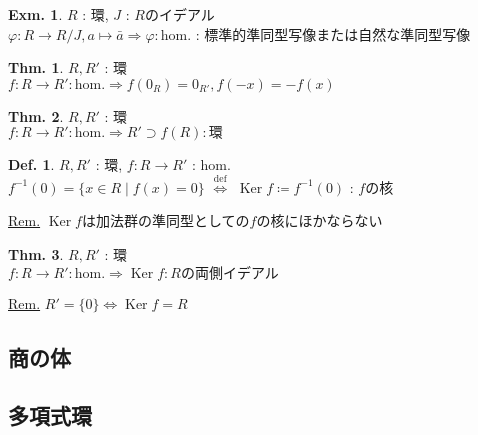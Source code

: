 \documentclass[uplatex,dvipdfmx,9pt]{beamer}
\newcommand{\defarrow}{\overset{\mathrm{def}}{\Leftrightarrow}}
\newcommand{\inverse}[1]{#1^{-1}}
\newcommand{\Ker}{\operatorname{Ker}}
\newcommand{\sscount}{\textsection \thesubsection}
\newcounter{textExmCount}
\theoremstyle{definition} %
\newtheorem{defn}{Def.}[subsection] %
\newtheorem{thm}{Thm.}[subsection] %
\theoremstyle{example}
\newtheorem{exmText}[textExmCount]{Exm.}
\begin{document}
    \begin{frame}

      \begin{exmText}
        $R$ : 環, $J$ : $R$のイデアル \\
        $\varphi \colon R \to R/J, a \mapsto \bar{a} \Rightarrow \varphi : \text{hom.}$ : \alert{標準的準同型写像}または\alert{自然な準同型写像}
      \end{exmText}

      \begin{thm}
        $R, R'$ : 環 \\
        $f\colon R \to R' : \text{hom.} \Rightarrow f(0_R) = 0_{R'}, f(-x) = -f(x)$
      \end{thm}

      \begin{thm}
        $R, R'$ : 環 \\
        $f\colon R \to R' : \text{hom.} \Rightarrow R' \supset f(R) : \text{環}$
      \end{thm}
      
    \end{frame}

    \begin{frame}
      
      \begin{defn}
        $R, R'$ : 環, $f\colon R \to R'$ : hom. \\
        $\inverse{f}(0) = \{x \in R \mid f(x) = 0\}$ $\defarrow$ $\Ker f \coloneqq \inverse{f}(0)$ : $f$の\alert{核}
      \end{defn}
      \underline{Rem.} $\Ker f$は加法群の準同型としての$f$の核にほかならない

      \begin{thm}
        $R, R'$ : 環 \\
        $f\colon R \to R' : \text{hom.} \Rightarrow \Ker f : \text{$R$の両側イデアル}$
      \end{thm}
      \underline{Rem.} $R'= \{0\} \Leftrightarrow \Ker f = R$

    \end{frame}

    \subsection{\sscount 商の体}
    \setcounter{textExmCount}{0}

    \subsection{\sscount 多項式環}
    \setcounter{textExmCount}{0}
\end{document}
